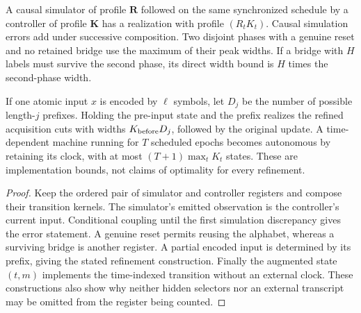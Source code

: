 \begin{proposition}\label{prop:v21-compose}
A causal simulator of profile $\mathbf R$ followed on the same synchronized
schedule by a controller of profile $\mathbf K$ has a realization with
profile $(R_tK_t)$. Causal simulation errors add under successive
composition. Two disjoint phases with a genuine reset and no retained
bridge use the maximum of their peak widths. If a bridge with $H$ labels
must survive the second phase, its direct width bound is $H$ times the
second-phase width.

If one atomic input $x$ is encoded by $\ell$ symbols, let $D_j$ be the
number of possible length-$j$ prefixes. Holding the pre-input state and
the prefix realizes the refined acquisition cuts with widths
$K_{\rm before}D_j$, followed by the original update. A time-dependent
machine running for $T$ scheduled epochs becomes autonomous by retaining
its clock, with at most $(T+1)\max_t K_t$ states. These are implementation
bounds, not claims of optimality for every refinement.
\end{proposition}
\begin{proof}
Keep the ordered pair of simulator and controller registers and compose
their transition kernels. The simulator's emitted observation is the
controller's current input. Conditional coupling until the first
simulation discrepancy gives the error statement. A genuine reset
permits reusing the alphabet, whereas a surviving bridge is another
register. A partial encoded input is determined by its prefix, giving
the stated refinement construction. Finally the augmented state
$(t,m)$ implements the time-indexed transition without an external
clock. These constructions also show why neither hidden selectors nor
an external transcript may be omitted from the register being counted.
\end{proof}
